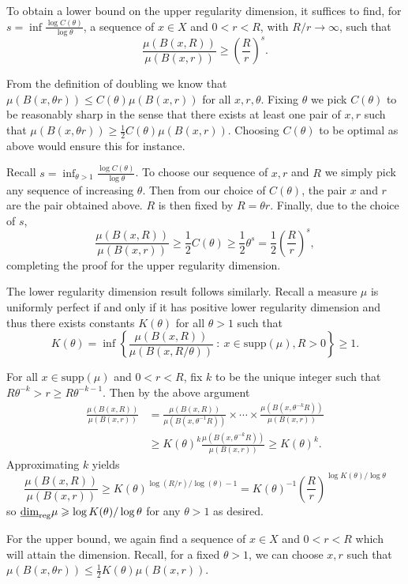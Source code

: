 To obtain a lower bound on the upper regularity dimension, it suffices to find, for $s = \inf\frac{\log C(\theta)}{\log \theta}$, a sequence of $x\in X$ and $0<r<R$, with $R/r \rightarrow \infty$, such that 
\[
\frac{\mu(B(x,R))}{\mu(B(x,r))} \ge \left(\frac{R}{r}\right)^s.
\]
	
	
From the definition of doubling we know that $\mu(B(x,\theta r) ) \le C(\theta) \mu(B(x,r))$ for all $x,r, \theta$. Fixing $\theta$ we pick $C(\theta)$ to be reasonably sharp in the sense that there exists at least one pair of $x,r$ such that $\mu(B(x,\theta r) ) \ge \frac{1}{2}C(\theta) \mu(B(x,r))$. Choosing $C(\theta)$ to be optimal as above would ensure this for instance.
	
Recall $s = \inf_{\theta > 1}\frac{\log C(\theta)}{\log \theta}$. To choose our sequence of $x,r$ and $R$ we simply pick any sequence of increasing $\theta$. Then from our choice of $C(\theta)$, the pair $x$ and $r$ are the pair obtained above. $R$ is then fixed by $R = \theta r$. Finally, due to the choice of $s$,
\[
\frac{\mu(B(x,R))}{\mu(B(x,r))} \ge \frac{1}{2} C(\theta)  \ge \frac{1}{2}\theta^s = \frac{1}{2}\left(\frac{R}{r} \right)^s,
\]
completing the proof for the upper regularity dimension.
	

The lower regularity dimension result follows similarly. Recall a measure $\mu$ is uniformly perfect if and only if it has positive lower regularity dimension and thus there exists constants $K(\theta)$ for all $\theta > 1$ such that 
\[
K(\theta) =  \inf \left\{ \frac{\mu(B(x,R))}{\mu(B(x,R/\theta))} \ : \ x \in \text{supp}(\mu), R>0 \right\} \geq 1.
\]

For all $x \in \text{supp}(\mu)$ and $0<r<R$, fix $k$ to be the unique integer such that $R \theta^{-k} > r \ge R \theta^{-k-1}$. Then by the above argument
\begin{align*}
\frac{\mu(B(x,R))}{\mu(B(x,r))} &= \frac{\mu(B(x,R))}{\mu(B(x,\theta^{-1}R))} \times \cdots \times \frac{\mu(B(x,\theta^{-k}R))}{\mu(B(x,r))} \\
&\ge K(\theta)^k \frac{\mu(B(x,\theta^{-k}R))}{\mu(B(x,r))} \ge K(\theta)^k.
\end{align*}
Approximating $k$ yields
\[
\frac{\mu(B(x,R))}{\mu(B(x,r))} \ge K(\theta)^{\log(R/r)/\log(\theta) - 1} = K(\theta)^{-1} \left(\frac{R}{r}\right)^{\log K(\theta)/ \log \theta}
\]
so $\underline{\dim}_{\textup{reg}} \mu \geqslant \log K(\theta) / \log \theta$ for any $\theta > 1$ as desired. 

For the upper bound, we again find a sequence of $x\in X$ and $0<r<R$ which will attain the dimension. Recall, for a fixed $\theta > 1$, we can choose $x,r$ such that $\mu(B(x,\theta r)) \le \frac{1}{2}K(\theta)\mu(B(x,r))$. 

